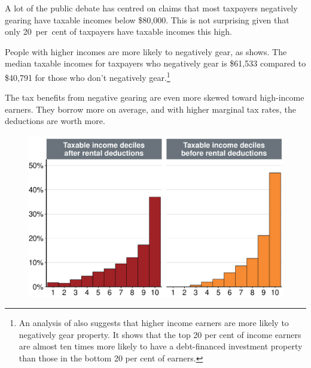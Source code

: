 \documentclass{grattanAlpha}\usepackage[]{graphicx}\usepackage[]{color}
\begin{document}
A lot of the public debate has centred on claims that most taxpayers negatively gearing have taxable incomes below \$80,000. This is not surprising given that only 20~per~cent of taxpayers have taxable incomes this high. 

People with higher incomes are more likely to negatively gear, as  shows. The median taxable incomes for taxpayers who negatively gear is \$61,533 compared to \$40,791 for those who don’t negatively gear.\footnote{An \textcite{RBA2015SubmissionHomeOwnershipInquiry} analysis of \textcite{HILDA2015} also suggests that higher income earners are more likely to negatively gear property. It shows that the top 20 per cent of income earners are almost ten times more likely to have a debt-financed investment property than those in the bottom 20 per cent of earners.}

The tax benefits from negative gearing are even more skewed toward high-income earners. They borrow more on average, and with higher marginal tax rates, the deductions are worth more. 

\begin{figure}
\includegraphics[width=\columnwidth]{CGT-NG-atlas//Benefit-NG-before-after-deductions-1}

\end{figure}
\end{document}
